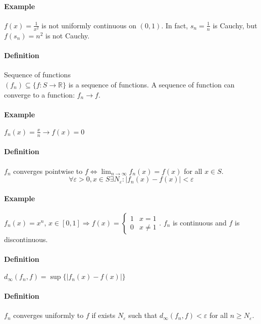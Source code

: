 \documentclass{article}
\newcommand{\DS}{\displaystyle}
\newcommand{\abs}[1]{\left|#1\right|}
\newcommand{\func}[3]{#1 : #2 \rightarrow #3}
\newcommand{\limn}{\lim_{n \to \infty}}
\newcommand{\intcc}[1]{\left[#1\right]}
\newcommand{\R}{\mathbb{R}}
\newcommand{\Ep}{\varepsilon}
\newcommand{\Def}{\paragraph{Definition}}
\newcommand{\Example}{\paragraph{Example}}
\begin{document}
  \Example $f(x) = \frac{1}{x^2}$ is not uniformly continuous on $(0,1)$. In
  fact, $s_n = \frac{1}{n}$ is Cauchy, but $f(s_n) = n^2$ is not Cauchy.

  \Def Sequence of functions
\\$(f_n) \subseteq \{ \func{f}{S}{\R} \}$ is a sequence of functions. A sequence
  of function can converge to a function: $f_n \to f$.

  \Example $f_n(x) = \frac{x}{n} \to f(x) = 0$

  \Def $f_n$ converges pointwise to $f \iff \DS \limn{f_n(x)} = f(x)$ for all
  $x \in S$.
\begin{equation*}
  \forall \Ep > 0, x \in S \exists N_\Ep : \abs{f_n(x) - f(x)} < \Ep
\end{equation*}

  \Example $f_n(x) = x^n$, $x \in \intcc{0,1} \Rightarrow f(x) =
  \begin{cases}1 & x = 1 \\ 0 & x \neq 1\end{cases}$. $f_n$ is continuous and
  $f$ is discontinuous.

  \Def $d_\infty(f_n,f) = \sup \{ \abs{f_n(x) - f(x)} \}$

  \Def $f_n$ converges uniformly to $f$ if exists $N_\Ep$ such that
  $d_\infty(f_n,f) < \Ep$ for all $n \geq N_\Ep$.
\end{document}

